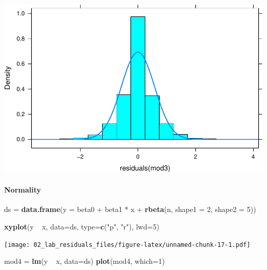 \documentclass[]{article}
\newenvironment{Shaded}{\begin{snugshade}}{\end{snugshade}}
\newcommand{\KeywordTok}[1]{\textcolor[rgb]{0.13,0.29,0.53}{\textbf{{#1}}}}
\newcommand{\DataTypeTok}[1]{\textcolor[rgb]{0.13,0.29,0.53}{{#1}}}
\newcommand{\DecValTok}[1]{\textcolor[rgb]{0.00,0.00,0.81}{{#1}}}
\newcommand{\StringTok}[1]{\textcolor[rgb]{0.31,0.60,0.02}{{#1}}}
\newcommand{\NormalTok}[1]{{#1}}
\let\oldparagraph\paragraph
\renewcommand{\paragraph}[1]{\oldparagraph{#1}\mbox{}}
\begin{document}
\includegraphics{02_lab_residuals_files/figure-latex/unnamed-chunk-15-4.pdf}

\paragraph{Normality}\label{normality}

\begin{Shaded}
\begin{Highlighting}[]
\NormalTok{ds =}\StringTok{ }\KeywordTok{data.frame}\NormalTok{(}\DataTypeTok{y =} \NormalTok{beta0 +}\StringTok{ }\NormalTok{beta1 *}\StringTok{ }\NormalTok{x +}\StringTok{ }\KeywordTok{rbeta}\NormalTok{(n, }\DataTypeTok{shape1 =} \DecValTok{2}\NormalTok{, }\DataTypeTok{shape2 =} \DecValTok{5}\NormalTok{))}
\end{Highlighting}
\end{Shaded}

\begin{Shaded}
\begin{Highlighting}[]
\KeywordTok{xyplot}\NormalTok{(y ~}\StringTok{ }\NormalTok{x, }\DataTypeTok{data=}\NormalTok{ds, }\DataTypeTok{type=}\KeywordTok{c}\NormalTok{(}\StringTok{"p"}\NormalTok{, }\StringTok{"r"}\NormalTok{), }\DataTypeTok{lwd=}\DecValTok{5}\NormalTok{)}
\end{Highlighting}
\end{Shaded}

\texttt{[image: 02\_lab\_residuals\_files/figure-latex/unnamed-chunk-17-1.pdf]}

\begin{Shaded}
\begin{Highlighting}[]
\NormalTok{mod4 =}\StringTok{ }\KeywordTok{lm}\NormalTok{(y ~}\StringTok{ }\NormalTok{x, }\DataTypeTok{data=}\NormalTok{ds)}
\KeywordTok{plot}\NormalTok{(mod4, }\DataTypeTok{which=}\DecValTok{1}\NormalTok{)}
\end{Highlighting}
\end{Shaded}
\end{document}
